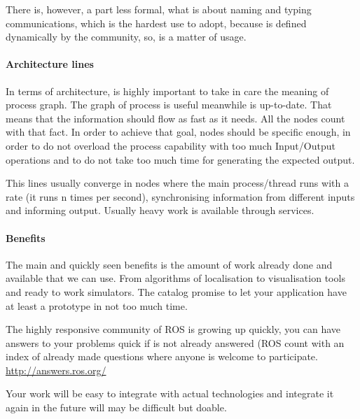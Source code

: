 \documentclass[a4paper,10pt,twoside]{book}
\begin{document}
				There is, however, a part less formal, what is about naming and typing communications, which is the hardest use to adopt, because is defined dynamically by the community, so, is a matter of usage. 
				
				
		\paragraph{Architecture lines}
	
				In terms of architecture, is highly important to take in care the meaning of process graph. 
			The graph of process is useful meanwhile is up-to-date. That means that the information should flow as fast as it needs. All the nodes count with that fact. 
			In order to achieve that goal, nodes should be specific enough, in order to do not overload the process capability with too much Input/Output operations and to do not take too much time for generating the expected output. 
			
			This lines usually converge in nodes where the main process/thread runs with a rate (it runs n times per second), synchronising information from different inputs and informing output. 
			Usually heavy work is available through services. 
		
		\paragraph{Benefits}
		
			The main and quickly seen benefits is the amount of work already done and available that we can use. From algorithms of localisation to visualisation tools and ready to work simulators. The catalog promise to let your application have at least a prototype in not too much time.
			
			The  highly responsive community of ROS is growing up quickly, you can have answers to your problems quick if is not already answered (ROS count with an index of already made questions where anyone is welcome to participate. \hyperlink{http://answers.ros.org/}{http://answers.ros.org/}
			
			Your work will be easy to integrate with actual technologies and integrate it again in the future will may be difficult but doable.
			
			
			
	
	\section{\pharos}
\end{document}
